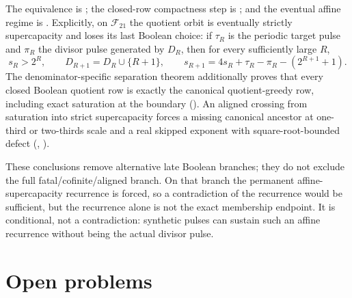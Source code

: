 \documentclass[11pt]{article}
\begin{document}
\noindent The equivalence is
;
the closed-row compactness step is
;
and the eventual affine regime is
.
Explicitly, on $\mathcal F_{21}$ the quotient orbit is eventually strictly
supercapacity and loses its last Boolean choice: if $\tau_R$ is the periodic
target pulse and $\pi_R$ the divisor pulse generated by $D_R$, then for every
sufficiently large $R$,
\[
 s_R>2^R,\qquad D_{R+1}=D_R\cup\{R+1\},\qquad
 s_{R+1}=4s_R+\tau_R-\pi_R-(2^{R+1}+1).
\]
The denominator-specific separation theorem additionally proves that every
closed Boolean quotient row is exactly the canonical quotient-greedy row,
including exact saturation at the boundary
().
An aligned crossing from saturation into strict supercapacity forces a
missing canonical ancestor at one-third or two-thirds scale and a real
skipped exponent with square-root-bounded defect
(,
).

These conclusions remove alternative late Boolean branches; they do not
exclude the full fatal/cofinite/aligned branch.  On that branch the permanent
affine-supercapacity recurrence is forced, so a contradiction of the
recurrence would be sufficient, but the recurrence alone is not the exact
membership endpoint.  It is conditional, not a contradiction: synthetic pulses
can sustain such an affine recurrence without being the actual divisor pulse.

\section{Open problems}\label{sec:open}
\end{document}
